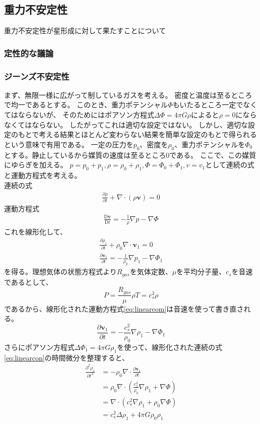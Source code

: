 \documentclass[a4j, dvipdfmx]{jsarticle}
\newcommand{\bv}{\mathbf{v}}
\newcommand{\pder}[2][]{\frac{\partial#1}{\partial#2}}
\newcommand{\ppder}[2][]{\frac{\partial^2#1}{\partial#2^2}}
\newcommand{\Dder}[2][]{\frac{\mathrm{D}#1}{\mathrm{D}#2}}
\newcommand{\beq}{\begin{equation}}
\newcommand{\eeq}{\end{equation}}
\begin{document}
\subsection{重力不安定性}
重力不安定性が星形成に対して果たすことについて

\subsubsection{定性的な議論}
\subsubsection{ジーンズ不安定性}
まず、無限一様に広がって制しているガスを考える。
密度と温度は至るところで均一であるとする。
このとき、重力ポテンシャル$\Phi$もいたるところ一定でなくてはならないが、
そのためにはポアソン方程式$\Delta \Phi = 4 \pi G \rho$によると$\rho=0$にならなくてはならない。
したがってこれは適切な設定ではない。
しかし、適切な設定のもとで考える結果とほとんど変わらない結果を簡単な設定のもとで得られるという意味で有用である。
一定の圧力を$p_0$、密度を$\rho_0$、重力ポテンシャルを$\Phi_0$とする。静止しているから媒質の速度は至るところ$0$である。
ここで、この媒質にゆらぎを加える。
$p = p_0 + p_1,\rho = \rho_0 + \rho_1,\Phi = \Phi_0 + \Phi_1, v = v_1$として連続の式と運動方程式を考える。\\
連続の式
\begin{align}
    \pder[\rho]{t} + \nabla \cdot (\rho \bv) = 0\label{eq:linearcon}
\end{align}
運動方程式
\begin{align}
    \Dder[\bv]{t} = - \frac{1}{\rho}\nabla p - \nabla \Phi\label{eq:lineareom}
\end{align}
これを線形化して、
\begin{align}
    \pder[\rho_1]{t} + \rho_0\nabla \cdot \bv_1 = 0\\
    \pder[\bv_1]{t} = - \frac{1}{\rho_0}\nabla p_1 - \nabla \Phi_1
\end{align}
を得る。理想気体の状態方程式より$R_{gas}$を気体定数、$\mu$を平均分子量、$c_s$を音速であるとして、
\beq
P = \frac{R_{gas}}{\mu} \rho T = c_s^2 \rho
\eeq
であるから、線形化された運動方程式\eqref{eq:lineareom}は音速を使って書き直される。
\beq
    \pder[\bv_1]{t} = - \frac{c_s^2}{\rho_0}\nabla \rho_1 - \nabla \Phi_1
\eeq
さらにポアソン方程式$\Delta \Phi_1 = 4 \pi G\rho_1$を使って、線形化された連続の式\eqref{eq:linearcon}の時間微分を整理すると、
\begin{align}
    \ppder[\rho_1]{t} &= - \rho_0 \nabla \cdot \pder[\bv_1]{t}\\
                      &= \rho_0 \nabla \cdot \left(\frac{c_s^2}{\rho_0}\nabla \rho_1 + \nabla \Phi\right)\\
                      &= \nabla \cdot \left(c_s^2\nabla \rho_1 + \rho_0\nabla \Phi\right)\\
                      &= c_s^2\Delta\rho_1 + 4\pi G\rho_0\rho_1
\end{align}
\end{document}
